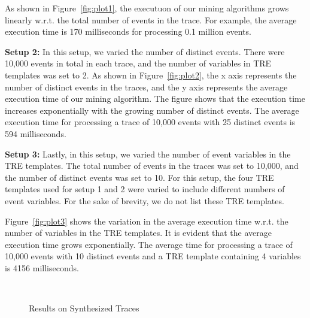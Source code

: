 \documentclass[]{sigplanconf}
\begin{document}
As shown in Figure~\ref{fig:plot1}, the executuon of our mining algorithms grows linearly w.r.t. the total number of events in the trace. For example, the average execution time is 170 milliseconds for processing 0.1 million events.

\vspace{3mm}

\noindent \textbf{Setup 2:}
In this setup, we varied the number of distinct events. There were 10,000 events in total in each trace, and the number of variables in TRE templates was set to 2. As shown in Figure~\ref{fig:plot2}, the x axis represents the number of distinct events in the traces, and the y axis represents the average execution time of our mining algorithm. The figure shows that the execution time increases exponentially with the growing number of distinct events. The average execution time for processing a trace of 10,000 events with 25 distinct events is 594 milliseconds.

\vspace{3mm}

\noindent \textbf{Setup 3:}
Lastly, in this setup, we varied the number of event variables in the TRE templates. The total number of events in the traces was set to 10,000, and the number of distinct events was set to 10. For this setup, the four TRE templates used for setup 1 and 2 were varied to include different numbers of event variables. For the sake of brevity, we do not list these TRE templates.

Figure~\ref{fig:plot3} shows the variation in the average execution time w.r.t. the number of variables in the TRE templates.
It is evident that the average execution time grows exponentially. The average time for processing a trace of 10,000 events with 10 distinct events and a TRE template containing 4 variables is 4156 milliseconds.

\begin{figure}[!ht]
  \centering
  \\
  \caption{Results on Synthesized Traces}\label{Algs_synth}
\end{figure}
\end{document}
